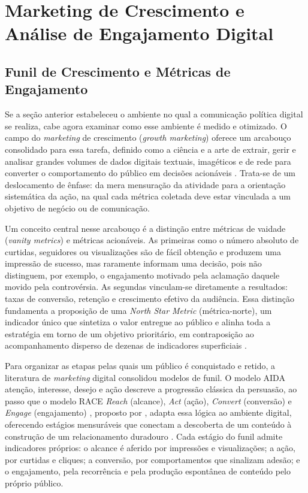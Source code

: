 \section{Marketing de Crescimento e Análise de Engajamento Digital}

\subsection{Funil de Crescimento e Métricas de Engajamento}

Se a seção anterior estabeleceu o ambiente no qual a comunicação política digital se realiza, cabe agora examinar como esse ambiente é medido e otimizado. O campo do \emph{marketing} de crescimento (\emph{growth marketing}) oferece um arcabouço consolidado para essa tarefa, definido como a ciência e a arte de extrair, gerir e analisar grandes volumes de dados digitais \textemdash{} textuais, imagéticos e de rede \textemdash{} para converter o comportamento do público em decisões acionáveis \cite{feroz2024}. Trata-se de um deslocamento de ênfase: da mera mensuração da atividade para a orientação sistemática da ação, na qual cada métrica coletada deve estar vinculada a um objetivo de negócio ou de comunicação.

Um conceito central nesse arcabouço é a distinção entre métricas de vaidade (\emph{vanity metrics}) e métricas acionáveis. As primeiras \textemdash{} como o número absoluto de curtidas, seguidores ou visualizações \textemdash{} são de fácil obtenção e produzem uma impressão de sucesso, mas raramente informam uma decisão, pois não distinguem, por exemplo, o engajamento motivado pela aclamação daquele movido pela controvérsia. As segundas vinculam-se diretamente a resultados: taxas de conversão, retenção e crescimento efetivo da audiência. Essa distinção fundamenta a proposição de uma \emph{North Star Metric} (métrica-norte), um indicador único que sintetiza o valor entregue ao público e alinha toda a estratégia em torno de um objetivo prioritário, em contraposição ao acompanhamento disperso de dezenas de indicadores superficiais \cite{feroz2024}.

Para organizar as etapas pelas quais um público é conquistado e retido, a literatura de \emph{marketing} digital consolidou modelos de funil. O modelo AIDA \textemdash{} atenção, interesse, desejo e ação \textemdash{} descreve a progressão clássica da persuasão, ao passo que o modelo RACE \textemdash{} \emph{Reach} (alcance), \emph{Act} (ação), \emph{Convert} (conversão) e \emph{Engage} (engajamento) \textemdash{}, proposto por , adapta essa lógica ao ambiente digital, oferecendo estágios mensuráveis que conectam a descoberta de um conteúdo à construção de um relacionamento duradouro \cite{feroz2024}. Cada estágio do funil admite indicadores próprios: o alcance é aferido por impressões e visualizações; a ação, por curtidas e cliques; a conversão, por comportamentos que sinalizam adesão; e o engajamento, pela recorrência e pela produção espontânea de conteúdo pelo próprio público.

